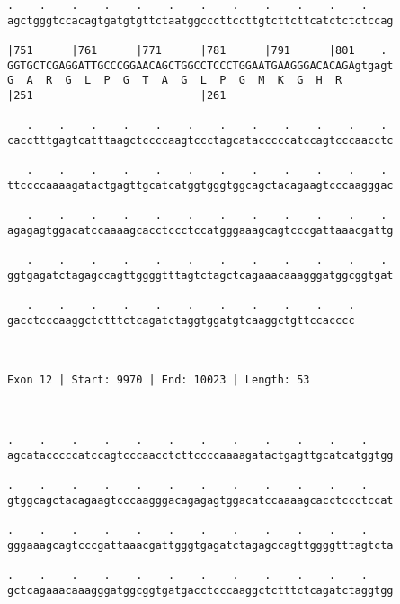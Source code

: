 \documentclass{article}
\begin{document}
\begin{Verbatim}
.    .    .    .    .    .    .    .    .    .    .    .    
agctgggtccacagtgatgtgttctaatggcccttccttgtcttcttcatctctctccag
                                                            
|751      |761      |771      |781      |791      |801    . 
GGTGCTCGAGGATTGCCCGGAACAGCTGGCCTCCCTGGAATGAAGGGACACAGAgtgagt
G  A  R  G  L  P  G  T  A  G  L  P  G  M  K  G  H  R        
|251                          |261                          
  
   .    .    .    .    .    .    .    .    .    .    .    . 
cacctttgagtcatttaagctccccaagtccctagcatacccccatccagtcccaacctc
                                                            
   .    .    .    .    .    .    .    .    .    .    .    . 
ttccccaaaagatactgagttgcatcatggtgggtggcagctacagaagtcccaagggac
                                                            
   .    .    .    .    .    .    .    .    .    .    .    . 
agagagtggacatccaaaagcacctccctccatgggaaagcagtcccgattaaacgattg
                                                            
   .    .    .    .    .    .    .    .    .    .    .    . 
ggtgagatctagagccagttggggtttagtctagctcagaaacaaagggatggcggtgat
                                                            
   .    .    .    .    .    .    .    .    .    .    .
gacctcccaaggctctttctcagatctaggtggatgtcaaggctgttccacccc
                                                      
                                                      
 
Exon 12 | Start: 9970 | End: 10023 | Length: 53



.    .    .    .    .    .    .    .    .    .    .    .    
agcatacccccatccagtcccaacctcttccccaaaagatactgagttgcatcatggtgg
                                                            
.    .    .    .    .    .    .    .    .    .    .    .    
gtggcagctacagaagtcccaagggacagagagtggacatccaaaagcacctccctccat
                                                            
.    .    .    .    .    .    .    .    .    .    .    .    
gggaaagcagtcccgattaaacgattgggtgagatctagagccagttggggtttagtcta
                                                            
.    .    .    .    .    .    .    .    .    .    .    .    
gctcagaaacaaagggatggcggtgatgacctcccaaggctctttctcagatctaggtgg
                                                            

\end{Verbatim}
\end{document}
